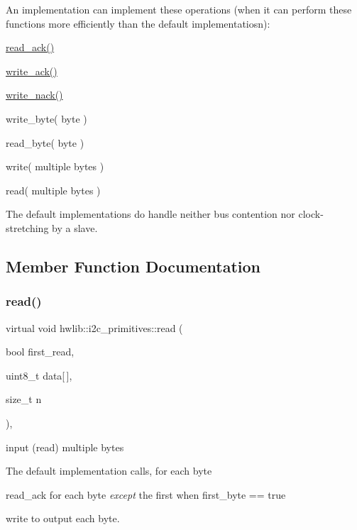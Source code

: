 An implementation can implement these operations (when it can perform these functions more efficiently than the default implementatiosn)\+:
\begin{DoxyItemize}
\item \hyperlink{classhwlib_1_1i2c__primitives_adfa6c493163d397f58a3e2ba4617dbac}{read\+\_\+ack()}
\item \hyperlink{classhwlib_1_1i2c__primitives_a711df86e5129b7daeff7a622b7b734c6}{write\+\_\+ack()}
\item \hyperlink{classhwlib_1_1i2c__primitives_a5ca312553bc0817ffecf5f90caf96396}{write\+\_\+nack()}
\item write\+\_\+byte( byte )
\item read\+\_\+byte( byte )
\item write( multiple bytes )
\item read( multiple bytes )
\end{DoxyItemize}

The default implementations do handle neither bus contention nor clock-\/stretching by a slave. 

\subsection{Member Function Documentation}
\mbox{\label{classhwlib_1_1i2c__primitives_a2a8cc988531ea774d39d726f213f8585}} 
\subsubsection{\texorpdfstring{read()}{read()}}
{\footnotesize\ttfamily virtual void hwlib\+::i2c\+\_\+primitives\+::read (\begin{DoxyParamCaption}\item[{bool}]{first\+\_\+read,  }\item[{uint8\+\_\+t}]{data\mbox{[}$\,$\mbox{]},  }\item[{size\+\_\+t}]{n }\end{DoxyParamCaption})\hspace{0.3cm}{\ttfamily [inline]}, {\ttfamily [virtual]}}

input (read) multiple bytes

The default implementation calls, for each byte
\begin{DoxyItemize}
\item read\+\_\+ack for each byte {\itshape except} the first when first\+\_\+byte == true
\item write to output each byte. 
\end{DoxyItemize}\mbox{\label{classhwlib_1_1i2c__primitives_adfa6c493163d397f58a3e2ba4617dbac}} 
